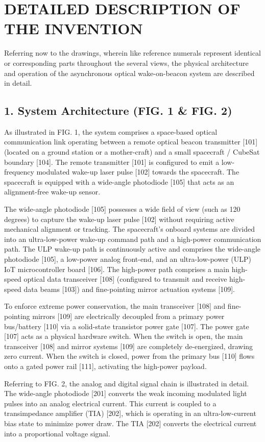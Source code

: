 \documentclass[12pt,a4paper]{article}
\begin{document}
\section*{DETAILED DESCRIPTION OF THE INVENTION}
Referring now to the drawings, wherein like reference numerals represent identical or corresponding parts throughout the several views, the physical architecture and operation of the asynchronous optical wake-on-beacon system are described in detail.

\subsection*{1. System Architecture (FIG. 1 \& FIG. 2)}
As illustrated in FIG. 1, the system comprises a space-based optical communication link operating between a remote optical beacon transmitter [101] (located on a ground station or a mother-craft) and a small spacecraft / CubeSat boundary [104]. The remote transmitter [101] is configured to emit a low-frequency modulated wake-up laser pulse [102] towards the spacecraft. The spacecraft is equipped with a wide-angle photodiode [105] that acts as an alignment-free wake-up sensor. 

The wide-angle photodiode [105] possesses a wide field of view (such as 120 degrees) to capture the wake-up laser pulse [102] without requiring active mechanical alignment or tracking. The spacecraft's onboard systems are divided into an ultra-low-power wake-up command path and a high-power communication path. The ULP wake-up path is continuously active and comprises the wide-angle photodiode [105], a low-power analog front-end, and an ultra-low-power (ULP) IoT microcontroller board [106]. The high-power path comprises a main high-speed optical data transceiver [108] (configured to transmit and receive high-speed data beams [103]) and fine-pointing mirror actuation systems [109].

To enforce extreme power conservation, the main transceiver [108] and fine-pointing mirrors [109] are electrically decoupled from a primary power bus/battery [110] via a solid-state transistor power gate [107]. The power gate [107] acts as a physical hardware switch. When the switch is open, the main transceiver [108] and mirror systems [109] are completely de-energized, drawing zero current. When the switch is closed, power from the primary bus [110] flows onto a gated power rail [111], activating the high-power payload.

Referring to FIG. 2, the analog and digital signal chain is illustrated in detail. The wide-angle photodiode [201] converts the weak incoming modulated light pulses into an analog electrical current. This current is coupled to a transimpedance amplifier (TIA) [202], which is operating in an ultra-low-current bias state to minimize power draw. The TIA [202] converts the electrical current into a proportional voltage signal. 
\end{document}
